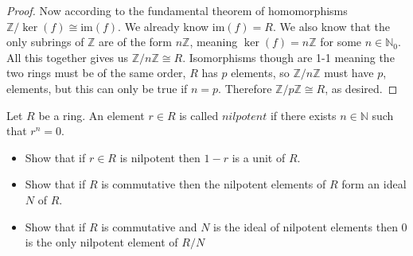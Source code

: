 \documentclass[11pt]{article}
\newenvironment{problem}[2][Problem\!]{\begin{trivlist}
\item[\hskip \labelsep {\bfseries #1}\hskip \labelsep {\bfseries #2}]}{\end{trivlist}}
\newcommand{\zz}{\mathbb Z}   %
\newcommand{\nn}{\mathbb N}   %
\begin{document}
\begin{itemize}
\begin{proof}
        Now according to the fundamental theorem of homomorphisms $\zz/\ker(f) \cong \text{im}(f)$. We already know im$(f) = R$. We also know that the only subrings of $\zz$ are of the form $n\zz$, meaning $\ker(f) = n\zz$ for some $n \in \nn_0$. All this together gives us $\zz/n\zz \cong R$. Isomorphisms though are 1-1 meaning the two rings must be of the same order, $R$ has $p$ elements, so $\zz/n\zz$ must have $p$, elements, but this can only be true if $n =p$. Therefore $\zz/p\zz \cong R$, as desired. 

    \end{proof} 
\end{itemize}

\begin{tcolorbox}
    \begin{problem} {10.4}
        Let $R$ be a ring. An element $r \in R$ is called $\textit{nilpotent}$ if there exists $n \in \nn$ such that $r^{n} = 0$.
        \begin{itemize}
            \item[(a)] Show that if $r\in R$ is nilpotent then $1-r$ is a unit of $R$. 
            \item[(b)] Show that if $R$ is commutative then the nilpotent elements of $R$ form an ideal $N$ of $R$.
            \item[(c)] Show that if $R$ is commutative and $N$ is the ideal of nilpotent elements then 0 is the only nilpotent element of $R/N$  
        \end{itemize}
    \end{problem}
\end{tcolorbox}
\end{document}

